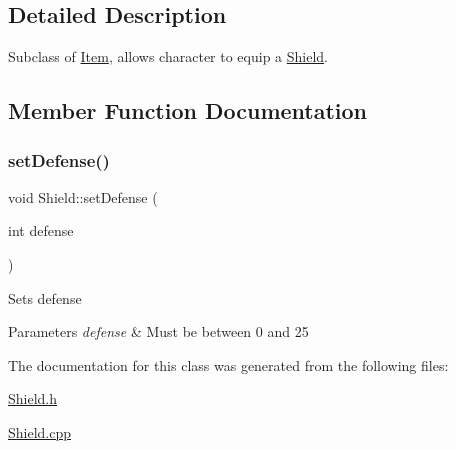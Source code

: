 \subsection{Detailed Description}
Subclass of \hyperlink{class_item}{Item}, allows character to equip a \hyperlink{class_shield}{Shield}. 

\subsection{Member Function Documentation}
\hypertarget{class_shield_a3e421a1c80aae934300dadf6db390bf1}{}\label{class_shield_a3e421a1c80aae934300dadf6db390bf1} 
\subsubsection{\texorpdfstring{set\+Defense()}{setDefense()}}
{\footnotesize\ttfamily void Shield\+::set\+Defense (\begin{DoxyParamCaption}\item[{int}]{defense }\end{DoxyParamCaption})}

Sets defense 
\begin{DoxyParams}{Parameters}
{\em defense} & Must be between 0 and 25 \\
\hline
\end{DoxyParams}


The documentation for this class was generated from the following files\+:\begin{DoxyCompactItemize}
\item 
\hyperlink{_shield_8h}{Shield.\+h}\item 
\hyperlink{_shield_8cpp}{Shield.\+cpp}\end{DoxyCompactItemize}
